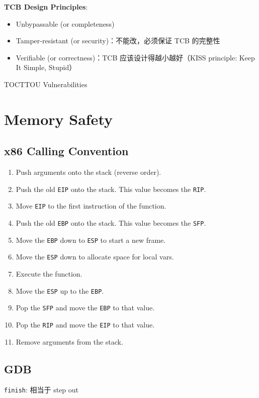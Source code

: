 \documentclass[9pt,landscape]{article}
\begin{document}
\begin{multicols}{2}
\textbf{TCB Design Principles}:

\begin{itemize}
\item Unbypassable (or completeness)
\item Tamper-resistant (or security)：不能改，必须保证 TCB 的完整性
\item Verifiable (or correctness)：TCB 应该设计得越小越好（KISS principle: Keep It Simple, Stupid）
\end{itemize}

TOCTTOU Vulnerabilities

\section{Memory Safety}

\subsection{x86 Calling Convention}

\begin{enumerate}
\item Push arguments onto the stack (reverse order).
\item Push the old \texttt{EIP} onto the stack. This value becomes the \texttt{RIP}.
\item Move \texttt{EIP} to the first instruction of the function.
\item Push the old \texttt{EBP} onto the stack. This value becomes the \texttt{SFP}.
\item Move the \texttt{EBP} down to \texttt{ESP} to start a new frame.
\item Move the \texttt{ESP} down to allocate space for local vars.
\item Execute the function.
\item Move the \texttt{ESP} up to the \texttt{EBP}.
\item Pop the \texttt{SFP} and move the \texttt{EBP} to that value.
\item Pop the \texttt{RIP} and move the \texttt{EIP} to that value.
\item Remove arguments from the stack.
\end{enumerate}

\subsection{GDB}

\texttt{finish}: 相当于 step out


\end{multicols}
\end{document}
